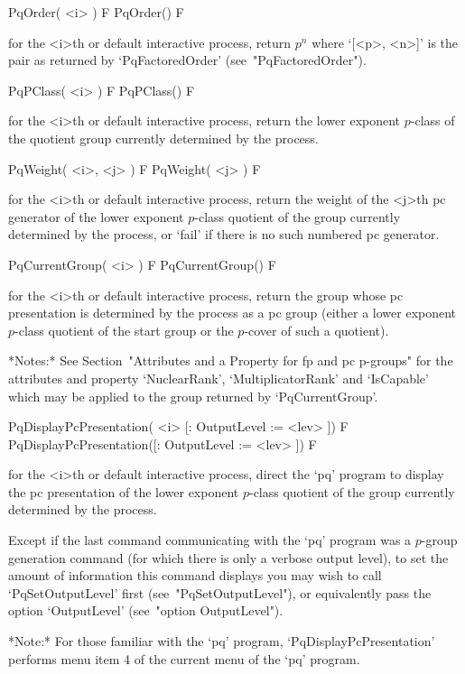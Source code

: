 \>PqOrder( <i> ) F
\>PqOrder() F

for the <i>th or default  interactive  {\ANUPQ}  process,  return  $p^n$
where  `[<p>,  <n>]'  is  the  pair  as  returned  by   `PqFactoredOrder'
(see~"PqFactoredOrder").

\>PqPClass( <i> ) F
\>PqPClass() F

for the <i>th or default interactive {\ANUPQ} process, return  the  lower
exponent $p$-class of the quotient  group  currently  determined  by  the
process.

\>PqWeight( <i>, <j> ) F
\>PqWeight( <j> ) F

for the <i>th or default interactive {\ANUPQ} process, return the  weight
of the <j>th pc generator of the lower exponent $p$-class quotient of the
group currently determined by the process, or `fail' if there is no  such
numbered pc generator.

\>PqCurrentGroup( <i> ) F
\>PqCurrentGroup() F

for the <i>th or default interactive {\ANUPQ} process, return  the  group
whose pc presentation is determined by the process as a {\GAP}  pc  group
(either a lower exponent $p$-class quotient of the  start  group  or  the
$p$-cover of such a quotient).

*Notes:*
See Section~"Attributes and a Property for fp and pc  p-groups"  for  the
attributes   and   property   `NuclearRank',   `MultiplicatorRank'    and
`IsCapable'  which  may   be   applied   to   the   group   returned   by
`PqCurrentGroup'.

\>PqDisplayPcPresentation( <i> [: OutputLevel := <lev> ]) F
\>PqDisplayPcPresentation([: OutputLevel := <lev> ]) F

for the <i>th or default interactive {\ANUPQ} process,  direct  the  `pq'
program to display the pc presentation of  the  lower  exponent  $p$-class
quotient of the group currently determined by the process.

Except if the last command communicating  with  the  `pq'  program  was  a
$p$-group generation command (for which there is only  a  verbose  output
level), to set the amount of information this command  displays  you  may
wish  to  call  `PqSetOutputLevel'  first  (see~"PqSetOutputLevel"),   or
equivalently pass the option `OutputLevel' (see~"option OutputLevel").

*Note:*
For  those  familiar  with  the  `pq'  program,  `PqDisplayPcPresentation'
performs menu item 4 of the current menu of the `pq' program.

